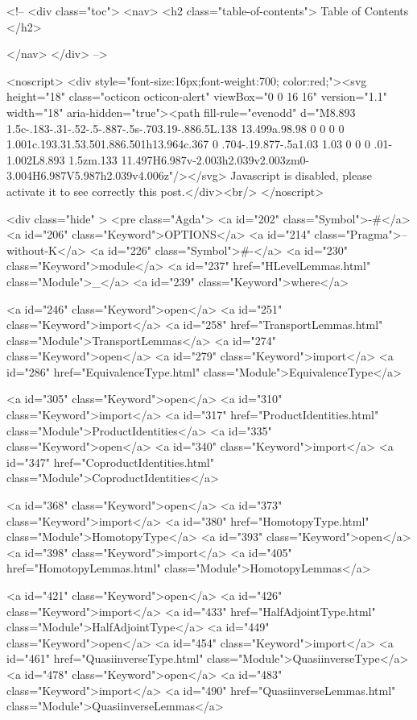   <!-- 
  <div class="toc">
    <nav>
    <h2 class="table-of-contents"> Table of Contents </h2>
      

    </nav>
  </div>
   -->

  <noscript>
  <div style="font-size:16px;font-weight:700; color:red;"><svg height="18" class="octicon octicon-alert" viewBox="0 0 16 16" version="1.1" width="18" aria-hidden="true"><path fill-rule="evenodd" d="M8.893 1.5c-.183-.31-.52-.5-.887-.5s-.703.19-.886.5L.138 13.499a.98.98 0 0 0 0 1.001c.193.31.53.501.886.501h13.964c.367 0 .704-.19.877-.5a1.03 1.03 0 0 0 .01-1.002L8.893 1.5zm.133 11.497H6.987v-2.003h2.039v2.003zm0-3.004H6.987V5.987h2.039v4.006z"/></svg> Javascript is disabled, please activate it to see correctly this post.</div><br/>
  </noscript>

  <div class="hide" >
<pre class="Agda">
<a id="202" class="Symbol">{-#</a> <a id="206" class="Keyword">OPTIONS</a> <a id="214" class="Pragma">--without-K</a> <a id="226" class="Symbol">#-}</a>
<a id="230" class="Keyword">module</a> <a id="237" href="HLevelLemmas.html" class="Module">_</a> <a id="239" class="Keyword">where</a>

<a id="246" class="Keyword">open</a> <a id="251" class="Keyword">import</a> <a id="258" href="TransportLemmas.html" class="Module">TransportLemmas</a>
<a id="274" class="Keyword">open</a> <a id="279" class="Keyword">import</a> <a id="286" href="EquivalenceType.html" class="Module">EquivalenceType</a>



<a id="305" class="Keyword">open</a> <a id="310" class="Keyword">import</a> <a id="317" href="ProductIdentities.html" class="Module">ProductIdentities</a>
<a id="335" class="Keyword">open</a> <a id="340" class="Keyword">import</a> <a id="347" href="CoproductIdentities.html" class="Module">CoproductIdentities</a>

<a id="368" class="Keyword">open</a> <a id="373" class="Keyword">import</a> <a id="380" href="HomotopyType.html" class="Module">HomotopyType</a>
<a id="393" class="Keyword">open</a> <a id="398" class="Keyword">import</a> <a id="405" href="HomotopyLemmas.html" class="Module">HomotopyLemmas</a>

<a id="421" class="Keyword">open</a> <a id="426" class="Keyword">import</a> <a id="433" href="HalfAdjointType.html" class="Module">HalfAdjointType</a>
<a id="449" class="Keyword">open</a> <a id="454" class="Keyword">import</a> <a id="461" href="QuasiinverseType.html" class="Module">QuasiinverseType</a>
<a id="478" class="Keyword">open</a> <a id="483" class="Keyword">import</a> <a id="490" href="QuasiinverseLemmas.html" class="Module">QuasiinverseLemmas</a>

